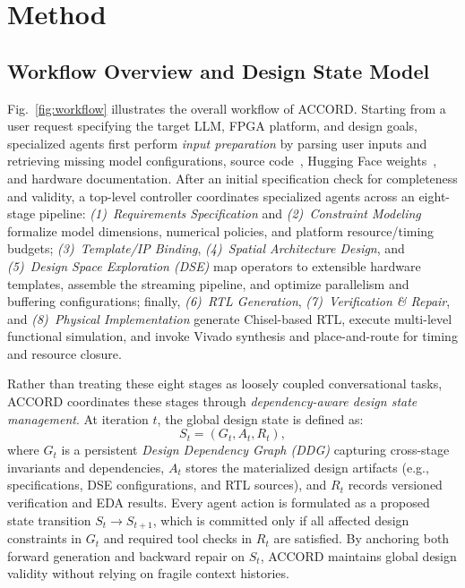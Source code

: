 \documentclass[9pt,conference]{IEEEtran}
\begin{document}
\section{Method}

\subsection{Workflow Overview and Design State Model}
Fig.~\ref{fig:workflow} illustrates the overall workflow of ACCORD. Starting from a user request specifying the target LLM, FPGA platform, and design goals, specialized agents first perform \emph{input preparation} by parsing user inputs and retrieving missing model configurations, source code~\cite{transformers}, Hugging Face weights~\cite{huggingface}, and hardware documentation. After an initial specification check for completeness and validity, a top-level controller coordinates specialized agents across an eight-stage pipeline: 
\emph{(1)~Requirements Specification} and \emph{(2)~Constraint Modeling} formalize model dimensions, numerical policies, and platform resource/timing budgets; 
\emph{(3)~Template/IP Binding}, \emph{(4)~Spatial Architecture Design}, and \emph{(5)~Design Space Exploration (DSE)} map operators to extensible hardware templates, assemble the streaming pipeline, and optimize parallelism and buffering configurations; 
finally, \emph{(6)~RTL Generation}, \emph{(7)~Verification \& Repair}, and \emph{(8)~Physical Implementation} generate Chisel-based RTL, execute multi-level functional simulation, and invoke Vivado synthesis and place-and-route for timing and resource closure.

Rather than treating these eight stages as loosely coupled conversational tasks, ACCORD coordinates these stages through \emph{dependency-aware design state management}. At iteration $t$, the global design state is defined as:
\begin{equation}
S_t = (G_t, A_t, R_t),
\end{equation}
where $G_t$ is a persistent \emph{Design Dependency Graph (DDG)} capturing cross-stage invariants and dependencies, $A_t$ stores the materialized design artifacts (e.g., specifications, DSE configurations, and RTL sources), and $R_t$ records versioned verification and EDA results. Every agent action is formulated as a proposed state transition $S_t \rightarrow S_{t+1}$, which is committed only if all affected design constraints in $G_t$ and required tool checks in $R_t$ are satisfied. By anchoring both forward generation and backward repair on $S_t$, ACCORD maintains global design validity without relying on fragile context histories.
\end{document}
